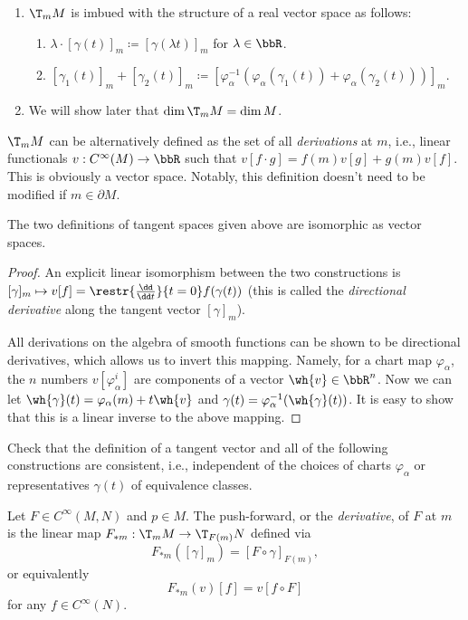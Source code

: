 \begin{enumerate}
    \item $\T_m M$ is imbued with the structure of a real vector space as follows:
    \begin{enumerate}
        \item $\lambda\cdot [\gamma(t)]_m\coloneqq [\gamma(\lambda t)]_m$ for $\lambda\in\bbR $.
        \item $[\gamma_1(t)]_m+[\gamma_2(t)]_m\coloneqq [\varphi_\alpha^{-1}(\varphi_\alpha(\gamma_1(t))+\varphi_\alpha(\gamma_2(t)))]_m.$
    \end{enumerate}
    \item We will show later that $\dim \T_m  M=\dim M$.
\end{enumerate}


\begin{defn}
    $\T_m  M$ can be alternatively defined as the set of all \emph{derivations} at $m$, i.e., linear functionals $v:C^\infty(M)\to \bbR $ such that $v[f\cdot g]=f(m)v[g]+g(m)v[f]$. This is obviously a vector space. Notably, this definition doesn't need to be modified if $m\in\partial M$.
\end{defn}

\begin{prop}
    The two definitions of tangent spaces given above are isomorphic as vector spaces.
\end{prop}
\begin{proof}
    An explicit linear isomorphism between the two constructions is $[\gamma]_m\mapsto v[f]=\restr{\frac{\dd}{\dd t}}{t=0}f(\gamma(t))$ (this is called the \emph{directional derivative} along the tangent vector $[\gamma]_m$). 

    All derivations on the algebra of smooth functions can be shown to be directional derivatives, which allows us to invert this mapping. Namely, for a chart map $\varphi_\alpha$, the $n$ numbers $v[\varphi_\alpha^i]$ are components of a vector $\wh{v}\in \bbR^n$. Now we can let $\wh{\gamma}(t)=\varphi_\alpha(m)+t\wh{v}$ and $\gamma(t)=\varphi_\alpha^{-1}(\wh{\gamma}(t))$. It is easy to show that this is a linear inverse to the above mapping.
\end{proof}


\begin{xca}
    Check that the definition of a tangent vector and all of the following constructions are consistent, i.e., independent of the choices of charts $\varphi_\alpha$ or representatives $\gamma(t)$ of equivalence classes.
    \end{xca}
    \begin{defn}
    Let $F\in C^\infty(M,N)$ and $p\in M$. The push-forward, or the \emph{derivative}, of $F$ at $m$ is the linear map $F_{\ast m}:\T_m M\to \T_{F(m)} N$ defined via \[F_{\ast m}([\gamma]_m)=[F\circ\gamma]_{F(m)},\] or equivalently \[F_{\ast m}(v)[f]=v[f\circ F]\] for any $f\in C^\infty (N)$.
\end{defn}


